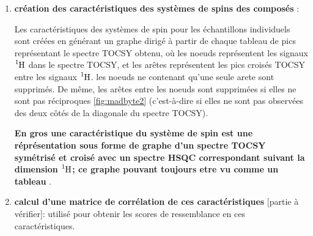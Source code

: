 \documentclass[letterpaper,twocolumn,10pt]{article}
\begin{document}
\begin{enumerate}
\begin{enumerate}
            \item suppréssion des pics invalides des spectres TOCSY 
            les pics invalides sont ceux issus des déplacements chimiques des dimensions 
            $\ce{^{1}_{}H}$ $\leq$ 2.5 ppm 

            \item symétrisation des spectres TOCSY obtenus : 
            
            Les données TOCSY sont symétrisées en corrigeant les déplacements chimiques f1(dimension $\ce{^{1}_{}H}$ de plus faible résolution) par rapport aux valeurs f2 (dimension $\ce{^{1}_{}H}$ de plus haute résolution) correspondantes, on tient compte des erreurs de déplacements suivant les dimensions 

            \item croisement des couples de spectres HSQC et TOCSY : 
            
            la liste des signaux TOCSY est comparée à la liste des pics HSQC dans la dimension $\ce{^{1}_{}H}$, et les signaux TOCSY n'ayant pas de correspondance avec les signaux HSQC correspondants sont supprimés, et on tient compte des erreurs de déplacements suivant les dimensions 
            
        \end{enumerate}
        L'érreur pour H est 0.05 ppm et pour C est 0.40 ppm
        \item \textbf{création des caractéristiques des systèmes de spins des composés} :
        
        Les caractéristiques des systèmes de spin pour les échantillons individuels sont créées en générant un graphe dirigé à partir de chaque tableau de pics représentant le spectre TOCSY obtenu, où les noeuds représentent les signaux $\ce{^{1}_{}H}$ dans le spectre TOCSY, et les arêtes représentent les pics croisés TOCSY entre les signaux $\ce{^{1}_{}H}$. les noeuds ne contenant qu'une seule arete sont supprimés. De même, les arêtes entre les noeuds sont supprimées si elles ne sont pas réciproques \ref{fig:madbyte2} (c'est-à-dire si elles ne sont pas observées des deux côtés de la diagonale du spectre TOCSY).

        
        \textbf{En gros une caractéristique du système de spin est une réprésentation sous forme de graphe d'un spectre TOCSY symétrisé et croisé avec un spectre HSQC correspondant suivant la dimension $\ce{^{1}_{}H}$; ce graphe pouvant toujours etre vu comme un tableau }.


        \item \textbf{calcul d'une matrice de corrélation de ces caractéristiques} [partie à vérifier]: utilisé pour obtenir les scores de ressemblance en ces caractéristiques.


\end{enumerate}
\end{document}
